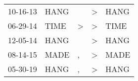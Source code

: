 \begin{supertabular}{p{0.07\textwidth}p{0.06\textwidth}p{0.02\textwidth}p{0.02\textwidth}p{0.06\textwidth}}
          10-16-13\textsuperscript{} &           HANG\textsuperscript{} &               &     \textgreater &           HANG\textsuperscript{} \\
          06-29-14\textsuperscript{} &           TIME\textsuperscript{} &  \textgreater &     \textgreater &           TIME\textsuperscript{} \\
          12-05-14\textsuperscript{} &           HANG\textsuperscript{} &               &     \textgreater &           HANG\textsuperscript{} \\
          08-14-15\textsuperscript{} &           MADE\textsuperscript{} &             , &     \textgreater &           MADE\textsuperscript{} \\
          05-30-19\textsuperscript{} &           HANG\textsuperscript{} &             , &     \textgreater &           HANG\textsuperscript{} \\
\end{supertabular}

